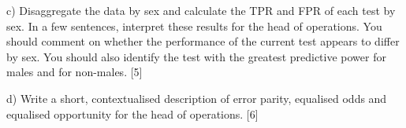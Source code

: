 \documentclass[a4paper, 11pt]{article}
\begin{document}
%
%
%
%

c) Disaggregate the data by sex and calculate the TPR and FPR of each test by sex. In a few sentences, interpret these results for the head of operations. You should comment on whether the performance of the current test appears to differ by sex. You should also identify the test with the greatest predictive power for males and for non-males.  [5]

%
%

d) Write a short, contextualised description of error parity, equalised odds and equalised opportunity for the head of operations. [6]

%
%
%
% 
%
%     
%
%
\end{document}

